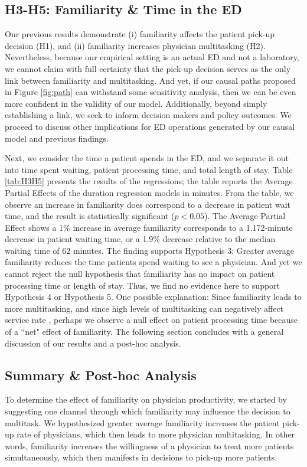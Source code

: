  \subsection{H3-H5: Familiarity \& Time in the ED}
 Our previous results demonstrate (i) familiarity affects the patient pick-up decision (H1), and (ii) familiarity increases physician multitasking (H2). Nevertheless, because our empirical setting is an actual ED and not a laboratory, we cannot claim with full certainty that the pick-up decision serves as the only link between familiarity and multitasking. And yet, if our causal paths proposed in Figure \ref{fig:path} can withstand some sensitivity analysis, then we can be even more confident in the validity of our model. Additionally, beyond simply establishing a link, we seek to inform decision makers and policy outcomes. We proceed to discuss other implications for ED operations generated by our causal model and previous findings.
 
 Next, we consider the time a patient spends in the ED, and we separate it out into time spent waiting, patient processing time, and total length of stay. Table \ref{tab:H3H5} presents the results of the regressions; the table reports the Average Partial Effects of the duration regression models in minutes. From the table, we observe an increase in familiarity does correspond to a decrease in patient wait time, and the result is statistically significant ($p < 0.05$). The Average Partial Effect shows a 1\% increase in average familiarity corresponds to a 1.172-minute decrease in patient waiting time, or a 1.9\% decrease relative to the median waiting time of 62 minutes. The finding supports Hypothesis 3: Greater average familiarity reduces the time patients spend waiting to see a physician. And yet we cannot reject the null hypothesis that familiarity has no impact on patient processing time or length of stay. Thus, we find no evidence here to support Hypothesis 4 or Hypothesis 5. One possible explanation: Since familiarity leads to more multitasking, and since high levels of multitasking can negatively affect service rate \citep[e.g.,][]{KC2014}, perhaps we observe a null effect on patient processing time because of a “net" effect of familiarity. The following section concludes with a general discussion of our results and a post-hoc analysis.
 
 \subsection{Summary \& Post-hoc Analysis}
 To determine the effect of familiarity on physician productivity, we started by suggesting one channel through which familiarity may influence the decision to multitask. We hypothesized greater average familiarity increases the patient pick-up rate of physicians, which then leads to more physician multitasking. In other words, familiarity increases the willingness of a physician to treat more patients simultaneously, which then manifests in decisions to pick-up more patients.
 
